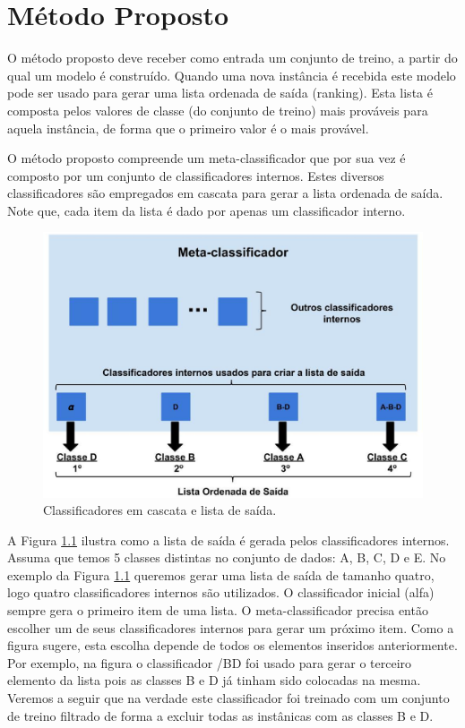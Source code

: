 \chapter{Método Proposto}
\label{chap:metodoproposto}

O método proposto deve receber como entrada um conjunto de treino, a partir do qual um modelo é construído. Quando uma nova instância é recebida este modelo pode ser usado para gerar uma lista ordenada de saída (ranking). Esta lista é composta pelos valores de classe (do conjunto de treino) mais prováveis para aquela instância, de forma que o primeiro valor é o mais provável. 

O método proposto compreende um meta-classificador que por sua vez é composto por um conjunto de classificadores internos. Estes diversos classificadores são empregados em cascata para gerar a lista ordenada de saída. Note que, cada item da lista é dado por apenas um classificador interno. 

\begin{figure}[h!]
  \includegraphics[width=\linewidth]{images/metodoproposto01.eps}
  \caption{Classificadores em cascata e lista de saída.}
  \label{fig:metodoproposto01}
\end{figure}

A Figura \ref{fig:metodoproposto01} ilustra como a lista de saída é gerada pelos classificadores internos.
Assuma que temos 5 classes distintas no conjunto de dados: A, B, C, D e E. 
No exemplo da Figura \ref{fig:metodoproposto01} queremos gerar uma lista de saída de tamanho quatro, logo quatro classificadores internos são utilizados. 
O classificador inicial (alfa) sempre gera o primeiro item de uma lista. 
O meta-classificador precisa então escolher um de seus classificadores internos para gerar um próximo item. 
Como a figura sugere, esta escolha depende de todos os elementos inseridos anteriormente. 
Por exemplo, na figura o classificador /BD foi usado para gerar o terceiro elemento da lista pois as classes B e D já tinham sido colocadas na mesma.
Veremos a seguir que na verdade este classificador foi treinado com um conjunto de treino filtrado de forma a excluir todas as instânicas com as classes B e D.

